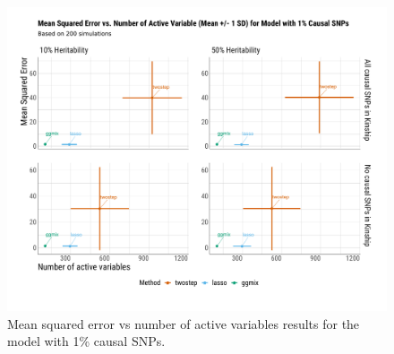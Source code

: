 \documentclass[12pt,letter]{article}\usepackage[]{graphicx}\usepackage[]{color}
\newenvironment{knitrout}{}{} %
\begin{document}
\begin{knitrout}\scriptsize
{}\color{fgcolor}\begin{figure}[H]

{\centering \includegraphics[width=1\linewidth]{figure/plot-mse-nactive-sim-1p-causal-1} 

}

\caption[Mean squared error vs number of active variables results for the model with 1\% causal SNPs]{Mean squared error vs number of active variables results for the model with 1\% causal SNPs.}\label{fig:plot-mse-nactive-sim-1p-causal}
\end{figure}


\end{knitrout}
\end{document}
